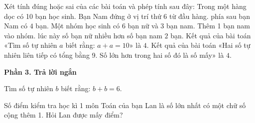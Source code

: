 \begin{ex} %
Xét tính đúng hoặc sai của các bài toán và phép tính sau đây:
\choiceTF
{\True Trong một hàng dọc có 10 bạn học sinh. Bạn Nam đứng ở vị trí thứ 6 từ đầu hàng. phía sau bạn Nam có $4$ bạn.}
{\True Một nhóm học sinh có 6 bạn nữ và 3 bạn nam. Thêm 1 bạn nam vào nhóm. lúc này số bạn nữ nhiều hơn số bạn nam $2$ bạn.}
{Kết quả của bài toán «Tìm số tự nhiên $a$ biết rằng: $a + a = 10$» là $4$.}
{Kết quả của bài toán «Hai số tự nhiên liên tiếp có tổng bằng 9. Số lớn hơn trong hai số đó là số mấy» là $4$.}
\end{ex}

\textbf{Phần 3. Trả lời ngắn}

\begin{ex} %
Tìm số tự nhiên $b$ biết rằng: $b + b = 6$.
\end{ex}

\begin{ex} %
Số điểm kiểm tra học kì 1 môn Toán của bạn Lan là số lớn nhất có một chữ số cộng thêm 1. Hỏi Lan được mấy điểm?
\end{ex}

